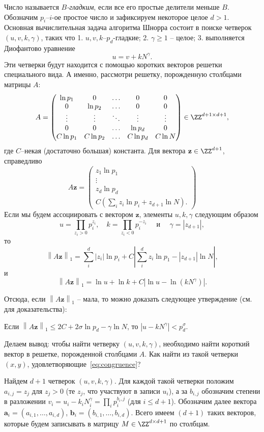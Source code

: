 \documentclass[11pt]{exam}
\theoremstyle{definition}
\newcommand*\abs[1]{\left\lvert#1\right\rvert}
\newcommand*\norm[1]{\left\lVert#1\right\rVert}
\newcommand{\zvec}{\ensuremath{\mathbf{z}}}
\begin{document}
{	Число называется \emph{$B$-гладким}, если все его простые делители меньше $B$. Обозначим $p_i$--$i$-ое простое число и зафиксируем некоторое целое $d>1$. Основная вычислительная задача алгоритма Шнорра состоит в поиске четверок $(u,v,k,\gamma)$, таких что 1. $u,v, k$--$p_d$-гладкие; 2. $\gamma \geq 1$ -- целое; 3. выполняется Диофантово уравнение
	\[
		u = v + kN^\gamma.
	\]
	\noindent Эти четверки будут находится с помощью коротких векторов решетки специального вида. А именно, рассмотри решетку, порожденную столбцами матрицы $A$:
	\[
	A = \begin{pmatrix}
	\ln p_1 & 0 & \ldots & 0  & 0 \\
	0 & \ln p_2 & \ldots & 0  & 0\\
	\vdots & \vdots & \ddots & \vdots & \vdots\\
	0 & 0 & \ldots & \ln p_d & 0 \\
	C \ln p_1 & C \ln p_2 & \ldots & C \ln p_d & C \ln N
	\end{pmatrix} \in \ZZ^{d+1 \times d+1},
	\] 
	\noindent где $C$--некая (достаточно большая) константа. Для вектора $\zvec \in \ZZ^{d+1}$, справедливо
	\[
		A\zvec = \begin{pmatrix}
		z_1 \ln p_1 \\
		\vdots \\
		z_d \ln p_d \\
		C (\sum_i z_i \ln p_i + z_{d+1} \ln N).
		\end{pmatrix}
	\]
	Если мы будем ассоциировать с вектором $\zvec$, элементы $u, k, \gamma$ следующим образом
	\[
		 u = \prod_{z_i > 0} p_i^{z_i}, \quad k = \prod_{z_i < 0} p_i^{-z_i} \quad \text{ и } \quad \gamma = \abs{z_{d+1}},
	\] 	
	то 
	\[
		\norm{A\zvec}_1 = \sum_i^{d} \abs{z_i} \ln p_i  + C \abs{\sum_i^{d} z_i \ln p_1 - \abs{z_{d+1}} \ln N},
	\]
	и
	\[
	\norm{A\zvec}_1 = \ln u + \ln k  + C \abs{\ln u  - \ln(k N^\gamma)}.
	\]
	
	Отсюда, если $\norm{A\zvec}_1$ -- мала, то можно доказать следующее утверждение (см.~\cite{vera10} для доказательства):
	
	Если $\norm{A\zvec}_1 \leq 2C + 2 \sigma \ln p_d - \gamma \ln N$, то $\abs{u - kN^\gamma} < p_d^\sigma$.
	
	Делаем вывод: чтобы найти четверку $(u,v,k,\gamma)$, необходимо найти короткий вектор в решетке, порожденной  столбцами $A$. 
	Как найти из такой четверки $(x,y)$, удовлетворяющие~\ref{eq:congruence}?
	
	Найдем $d+1$ четверок  $(u,v,k,\gamma)$.  Для каждой такой четверки положим $a_{i,j} = z_j$ для $z_j >0$ (те $z_j$, что участвуют в записи $u_i$), а за $b_{i,j}$ обозначим степени в разложении $v_i = u_i - k_iN^\gamma_i = \prod_i p_i^{b_i,j}$ (для $i \leq d+1$). Обозначим далее вектора $\mathbf{a}_i = (a_{i,1}, \ldots, a_{i,d})$, $\mathbf{b}_i = (b_{i,1}, \ldots, b_{i,d})$. Всего имеем $(d+1)$ таких векторов, которые будем записывать в матрицу $M \in\ZZ^{d \times d+1}$ по столбцам.
	
}
\end{document}
